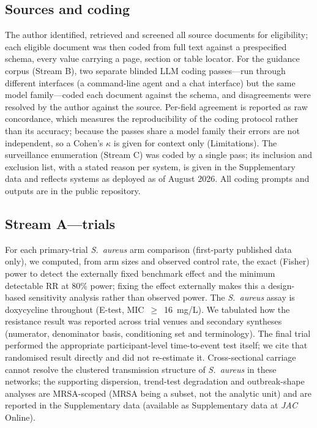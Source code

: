 \documentclass[12pt,a4paper]{article}
\newcommand{\sa}{\emph{S.~aureus}}
\begin{document}
\subsection*{Sources and coding}
The author identified, retrieved and screened all source documents for
eligibility; each eligible document was then coded from full text against a
prespecified schema, every value carrying a page, section or table locator. For
the guidance corpus (Stream B), two separate blinded LLM coding passes---run
through different interfaces (a command-line agent and a chat interface) but the
same model family---coded each document against the schema, and disagreements were
resolved by the author against the source. Per-field agreement is reported as raw
concordance, which measures the reproducibility of the coding protocol rather than
its accuracy; because the passes share a model family their errors are not
independent, so a Cohen's $\kappa$ is given for context only (Limitations). The surveillance enumeration (Stream C) was
coded by a single pass; its inclusion and exclusion list, with a stated reason
per system, is given in the Supplementary data and reflects systems as deployed
as of August 2026. All coding prompts and outputs are in the public repository.

\subsection*{Stream A---trials}
For each primary-trial \sa{} arm comparison (first-party published data only), we
computed, from arm sizes and observed control rate, the exact (Fisher) power to
detect the externally fixed benchmark effect and the minimum detectable RR at
80\% power; fixing the effect externally makes this a design-based sensitivity
analysis rather than observed power. The \sa{} assay is doxycycline throughout
(E-test, MIC~$\geq$~16~mg/L). We tabulated how the resistance result was reported
across trial venues and secondary syntheses (numerator, denominator basis,
conditioning set and terminology). The final trial performed the appropriate
participant-level time-to-event test itself; we cite that randomised result
directly and did not re-estimate it. Cross-sectional carriage cannot resolve the
clustered transmission structure of \sa{} in these networks; the supporting
dispersion, trend-test degradation and outbreak-shape analyses are MRSA-scoped
(MRSA being a subset, not the analytic unit) and are reported in the
Supplementary data (available as Supplementary data at \textit{JAC} Online).
\end{document}
